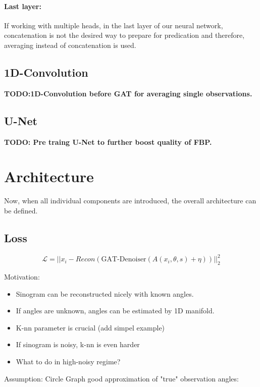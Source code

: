 \paragraph{Last layer:}
If working with multiple heads, in the last layer of our neural network, concatenation is not the desired 
way to prepare for predication and therefore, averaging instead of concatenation is used.


\subsection{1D-Convolution}
\textbf{TODO:1D-Convolution before GAT for averaging single observations.}


\subsection{U-Net}
\textbf{TODO: Pre traing U-Net to further boost quality of FBP.}


\section{Architecture}
Now, when all individual components are introduced, the overall architecture can be defined.



\subsection{Loss}

\begin{equation}
  \mathcal{L} = || x_i - Recon ( \text{GAT-Denoiser}(A(x_i, \theta, s) + \eta)) ||^2_2
\end{equation}



Motivation:
\begin{itemize}
  \item Sinogram can be reconstructed nicely with known angles.
  \item If angles are unknown, angles can be estimated by 1D manifold.
  \item K-nn parameter is crucial (add simpel example)
  \item If sinogram is noisy, k-nn is even harder
  \item What to do in high-noisy regime?
\end{itemize}

Assumption:
Circle Graph good approximation of "true" observation angles:

